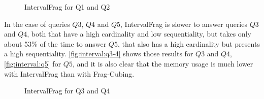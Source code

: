 \begin{figure}[H]
  \caption{IntervalFrag for Q1 and Q2}\label{fig:interval:q1-2}
  \vspace{6mm}
  \begin{center}
  \end{center}
  \vspace{2mm}
\end{figure}

In the case of queries $Q3$, $Q4$ and $Q5$, IntervalFrag is slower to answer queries $Q3$ and $Q4$, both that have a high cardinality and low sequentiality, but takes only about 53\% of the time to answer $Q5$, that also has a high cardinality but presents a high sequentiality.
\autoref{fig:interval:q3-4} shows those results for $Q3$ and $Q4$, \autoref{fig:interval:q5} for $Q5$, and it is also clear that the memory usage is much lower with IntervalFrag than with Frag-Cubing.

\begin{figure}[H]
  \caption{IntervalFrag for Q3 and Q4}\label{fig:interval:q3-4}
  \vspace{6mm}
  \begin{center}
  \end{center}
  \vspace{2mm}
\end{figure}

